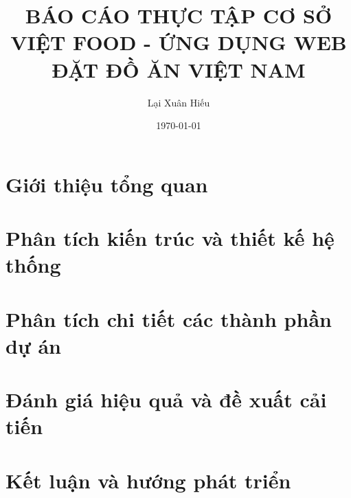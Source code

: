 \documentclass[12pt,a4paper]{report}
\title{\textbf{BÁO CÁO THỰC TẬP CƠ SỞ\\\vspace{0.5cm}VIỆT FOOD - ỨNG DỤNG WEB ĐẶT ĐỒ ĂN VIỆT NAM}}
\author{Lại Xuân Hiếu}
\date{\today}
\begin{document}
\maketitle
\tableofcontents

\chapter{Giới thiệu tổng quan}


\chapter{Phân tích kiến trúc và thiết kế hệ thống}


\chapter{Phân tích chi tiết các thành phần dự án}


\chapter{Đánh giá hiệu quả và đề xuất cải tiến}


\chapter{Kết luận và hướng phát triển}

\end{document}
